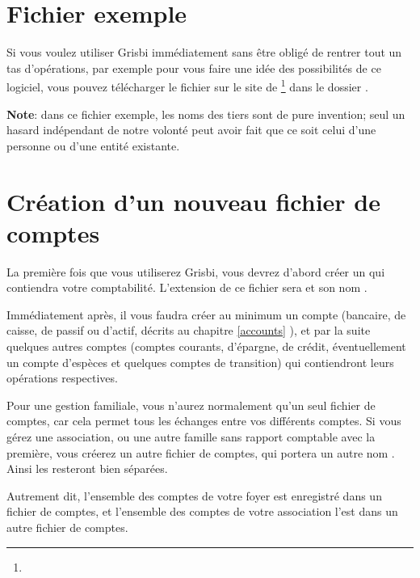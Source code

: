 \section{Fichier exemple\label{start-example}}


Si vous voulez utiliser Grisbi immédiatement sans être obligé de rentrer tout un tas d'opérations, par exemple pour vous faire une idée des possibilités de ce logiciel, vous pouvez télécharger le fichier  sur le site de \footnote{\urlSourceForgeDocumentation{}} dans le dossier .

\textbf{Note}: dans ce fichier exemple, les noms des tiers sont de pure invention; seul un hasard indépendant de notre volonté peut avoir fait que ce soit celui d'une personne ou d'une entité existante.


\section{Création d'un nouveau fichier de comptes\label{start-newfile}}


La première fois que vous utiliserez Grisbi, vous devrez d'abord créer un  qui contiendra votre comptabilité. L'\gls{extension} de ce fichier sera  et son nom . 

Immédiatement après, il vous faudra créer au minimum un compte (bancaire, de caisse, de passif ou d'actif, décrits au chapitre \vref{accounts} ), et par la suite quelques autres comptes (comptes courants, d'épargne, de crédit, éventuellement un compte d'espèces et quelques comptes de transition) qui contiendront leurs opérations respectives. 

Pour une gestion familiale, vous n'aurez normalement qu'un seul fichier de comptes, car cela permet tous les échanges entre vos différents comptes. Si vous gérez une association, ou une autre famille sans rapport comptable avec la première, vous créerez un autre fichier de comptes, qui portera un autre nom . Ainsi les  resteront bien séparées.

Autrement dit, l’ensemble des comptes de votre foyer est enregistré dans un fichier de comptes,
et l’ensemble des comptes de votre association l’est dans un autre fichier de comptes.

